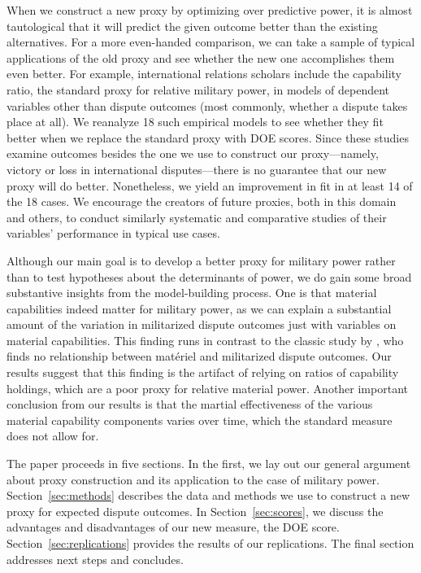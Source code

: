 When we construct a new proxy by optimizing over predictive power, it is almost tautological that it will predict the given outcome better than the existing alternatives.
For a more even-handed comparison, we can take a sample of typical applications of the old proxy and see whether the new one accomplishes them even better.
For example, international relations scholars include the capability ratio, the standard proxy for relative military power, in models of dependent variables other than dispute outcomes (most commonly, whether a dispute takes place at all).
We reanalyze 18 such empirical models to see whether they fit better when we replace the standard proxy with DOE scores.
Since these studies examine outcomes besides the one we use to construct our proxy---namely, victory or loss in international disputes---there is no guarantee that our new proxy will do better.
Nonetheless, we yield an improvement in fit in at least 14 of the 18 cases.
We encourage the creators of future proxies, both in this domain and others, to conduct similarly systematic and comparative studies of their variables' performance in typical use cases.

Although our main goal is to develop a better proxy for military power rather than to test hypotheses about the determinants of power, we do gain some broad substantive insights from the model-building process.
One is that material capabilities indeed matter for military power, as we can explain a substantial amount of the variation in militarized dispute outcomes just with variables on material capabilities.
This finding runs in contrast to the classic study by \citet{Maoz:1983cw}, who finds no relationship between matériel and militarized dispute outcomes.
Our results suggest that this finding is the artifact of relying on ratios of capability holdings, which are a poor proxy for relative material power.
Another important conclusion from our results is that the martial effectiveness of the various material capability components varies over time, which the standard measure does not allow for.

The paper proceeds in five sections.
In the first, we lay out our general argument about proxy construction and its application to the case of military power.
Section~\ref{sec:methods} describes the data and methods we use to construct a new proxy for expected dispute outcomes.
In Section~\ref{sec:scores}, we discuss the advantages and disadvantages of our new measure, the DOE score.
Section~\ref{sec:replications} provides the results of our replications.
The final section addresses next steps and concludes.


